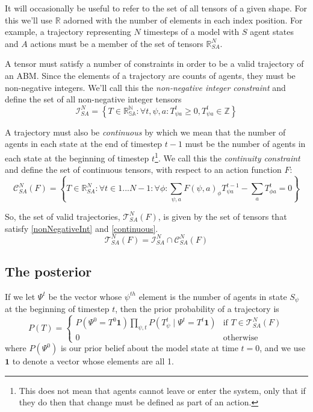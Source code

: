 \documentclass{article}
\begin{document}
It will occasionally be useful to refer to the set of all tensors of a given shape. For this we'll use $\mathbb{R}$ adorned with the number of elements in each index position. For example, a trajectory representing $N$ timesteps of a model with $S$ agent states and $A$ actions must be a member of the set of tensors $\mathbb{R}^N_{SA}$.

A tensor must satisfy a number of constraints in order to be a valid trajectory of an ABM. Since the elements of a trajectory are counts of agents, they must be non-negative integers. We'll call this the \textit{non-negative integer constraint} and define the set of all non-negative integer tensors
\begin{equation}
\mathcal{I}^N_{SA} = \left\{ T \in \mathbb{R^N_{SA}}: \forall t,\psi, a: T^t_{\psi a} \ge 0, T^t_{\psi a} \in \mathbb{Z}\right\}
\label{nonNegativeInt}
\end{equation}

A trajectory must also be \textit{continuous} by which we mean that the number of agents in each state at the end of timestep $t-1$ must be the number of agents in each state at the beginning of timestep $t$\footnote{This does not mean that agents cannot leave or enter the system, only that if they do then that change must be defined as part of an action.}. We call this the \textit{continuity constraint} and define the set of continuous tensors, with respect to an action function $F$:
\begin{equation}
\mathcal{C}^N_{SA}(F) = \left\{T\in\mathbb{R}^N_{SA}:  \forall t \in 1 ... N-1:\forall \phi: \sum_{\psi, a} F(\psi, a)_\phi T^{t-1}_{\psi a} - \sum_a T^t_{\phi a} = 0\right\}
\label{continuous}
\end{equation}

So, the set of valid trajectories, $\mathcal{T}^N_{SA}(F)$, is given by the set of tensors that satisfy \eqref{nonNegativeInt} and \eqref{continuous}.
\begin{equation}
\mathcal{T}^N_{SA}(F) = \mathcal{I}^N_{SA} \cap \mathcal{C}^N_{SA}(F)
\label{SetOfTrajectories}
\end{equation}


\subsection{The posterior}

If we let $\Psi^t$ be the vector whose $\psi^{th}$ element is the number of agents in state $S_\psi$ at the beginning of timestep $t$, then the prior probability of a trajectory is
\[
P(T) =
\begin{cases}
P\left(\Psi^0 = T^0 \mathbf{1} \right) \prod_{\psi, t} P\left(T^t_{\psi} \mid \Psi^t = T^t \mathbf{1}\right) & \text{if } T \in \mathcal{T}^N_{SA}(F) \\
0 & \text{otherwise}
\end{cases}
\]
where $P(\Psi^0)$ is our prior belief about the model state at time $t=0$, and we use $\mathbf{1}$ to denote a vector whose elements are all 1.
\end{document}
